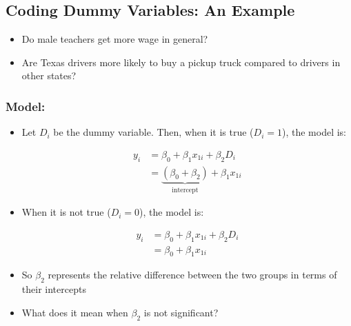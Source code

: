 \documentclass[10pt,article]{article}
\begin{document}
\subsection{Coding Dummy Variables: An Example}
\label{sec:org3673571}
\begin{itemize}
\item Do male teachers get more wage in general?
\item Are Texas drivers more likely to buy a pickup truck compared to drivers in
other states?
\end{itemize}
\subsubsection{Model:}
\label{sec:orgdb1c61e}
\begin{itemize}
\item Let \(D_i\) be the dummy variable. Then, when it is true (\(D_{i} =1\)), the model is:

\begin{align*} 
     y_i  & = \beta_0 + \beta_1 x_{1i} + \beta_2 D_i \\
          & = \underbrace{(\beta_0 + \beta_2)}_{\text{intercept}} + \beta_1 x_{1i} 
\end{align*}
\end{itemize}

\begin{itemize}
\item When it is not true (\(D_i = 0\)), the model is:

\begin{align*} 
    y_i & = \beta_0 + \beta_1 x_{1i} + \beta_2 D_i \\
        & = \beta_0 + \beta_1 x_{1i}
\end{align*}
\end{itemize}

\begin{itemize}
\item So \(\beta_2\) represents the relative difference between the two groups
in terms of their intercepts

\item What does it mean when \(\beta_2\) is not significant?
\end{itemize}
\end{document}

